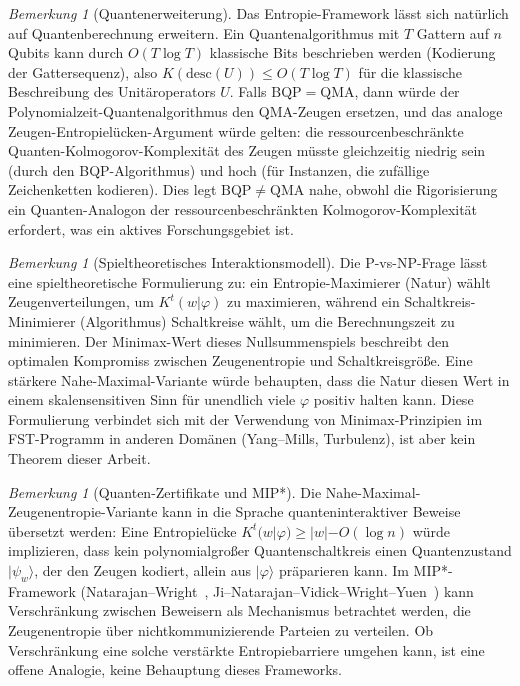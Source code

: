 \documentclass[aps,prd,twocolumn,superscriptaddress,nofootinbib]{revtex4-2}
\theoremstyle{definition}
\theoremstyle{remark}
\newtheorem{remark}[theorem]{Bemerkung}
\begin{document}
\begin{remark}[Quantenerweiterung]
\label{rem:quantum}
Das Entropie-Framework lässt sich natürlich auf Quantenberechnung erweitern. Ein Quantenalgorithmus mit $T$ Gattern auf $n$ Qubits kann durch $O(T \log T)$ klassische Bits beschrieben werden (Kodierung der Gattersequenz), also $K(\mathrm{desc}(U)) \leq O(T \log T)$ für die klassische Beschreibung des Unitäroperators $U$. Falls $\mathrm{BQP} = \mathrm{QMA}$, dann würde der Polynomialzeit-Quantenalgorithmus den QMA-Zeugen ersetzen, und das analoge Zeugen-Entropielücken-Argument würde gelten: die ressourcenbeschränkte Quanten-Kolmogorov-Komplexität des Zeugen müsste gleichzeitig niedrig sein (durch den BQP-Algorithmus) und hoch (für Instanzen, die zufällige Zeichenketten kodieren). Dies legt $\mathrm{BQP} \neq \mathrm{QMA}$ nahe, obwohl die Rigorisierung ein Quanten-Analogon der ressourcenbeschränkten Kolmogorov-Komplexität erfordert, was ein aktives Forschungsgebiet ist.
\end{remark}

\begin{remark}[Spieltheoretisches Interaktionsmodell]
\label{rem:game-theoretic}
Die P-vs-NP-Frage lässt eine spieltheoretische Formulierung zu: ein Entropie-Maximierer (\glqq Natur\grqq{}) wählt Zeugenverteilungen, um $K^t(w|\varphi)$ zu maximieren, während ein Schaltkreis-Minimierer (\glqq Algorithmus\grqq{}) Schaltkreise wählt, um die Berechnungszeit zu minimieren. Der Minimax-Wert dieses Nullsummenspiels beschreibt den optimalen Kompromiss zwischen Zeugenentropie und Schaltkreisgröße. Eine stärkere Nahe-Maximal-Variante würde behaupten, dass die Natur diesen Wert in einem skalensensitiven Sinn für unendlich viele $\varphi$ positiv halten kann. Diese Formulierung verbindet sich mit der Verwendung von Minimax-Prinzipien im FST-Programm in anderen Domänen (Yang--Mills, Turbulenz), ist aber kein Theorem dieser Arbeit.
\end{remark}

\begin{remark}[Quanten-Zertifikate und MIP*]
\label{rem:quantum-certificates}
Die Nahe-Maximal-Zeugenentropie-Variante kann in die Sprache quanteninteraktiver Beweise übersetzt werden: Eine Entropielücke $K^t(w|\varphi) \geq |w| - O(\log n)$ würde implizieren, dass kein polynomialgroßer Quantenschaltkreis einen Quantenzustand $|\psi_w\rangle$, der den Zeugen kodiert, allein aus $|\varphi\rangle$ präparieren kann. Im MIP*-Framework (Natarajan--Wright~\cite{NatarajanWright2019}, Ji--Natarajan--Vidick--Wright--Yuen~\cite{JiNatarajanVidickWrightYuen2021}) kann Verschränkung zwischen Beweisern als Mechanismus betrachtet werden, die Zeugenentropie über nichtkommunizierende Parteien zu \glqq verteilen\grqq{}. Ob Verschränkung eine solche verstärkte Entropiebarriere umgehen kann, ist eine offene Analogie, keine Behauptung dieses Frameworks.
\end{remark}
\end{document}
